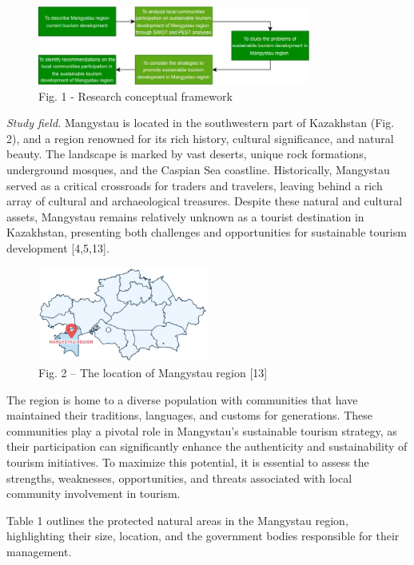 \begin{figure}[H]
	\centering
	\includegraphics[width=0.8\textwidth]{assets/337}
	\caption*{Fig. 1 - Research conceptual framework}
\end{figure}

\begin{multicols}{2}
\emph{Study field.} Mangystau is located in the southwestern part of
Kazakhstan (Fig. 2), and a region renowned for its rich history,
cultural significance, and natural beauty. The landscape is marked by
vast deserts, unique rock formations, underground mosques, and the
Caspian Sea coastline. Historically, Mangystau served as a critical
crossroads for traders and travelers, leaving behind a rich array of
cultural and archaeological treasures. Despite these natural and
cultural assets, Mangystau remains relatively unknown as a tourist
destination in Kazakhstan, presenting both challenges and opportunities
for sustainable tourism development {[}4,5,13{]}.
\end{multicols}

\begin{figure}[H]
	\centering
	\includegraphics[width=0.5\textwidth]{assets/338}
	\caption*{Fig. 2 -- The location of Mangystau region {[}13{]}}
\end{figure}

\begin{multicols}{2}
The region is home to a diverse population with communities that have
maintained their traditions, languages, and customs for generations.
These communities play a pivotal role in Mangystau's sustainable tourism
strategy, as their participation can significantly enhance the
authenticity and sustainability of tourism initiatives. To maximize this
potential, it is essential to assess the strengths, weaknesses,
opportunities, and threats associated with local community involvement
in tourism.

Table 1 outlines the protected natural areas in the Mangystau region,
highlighting their size, location, and the government bodies responsible
for their management.
\end{multicols}


